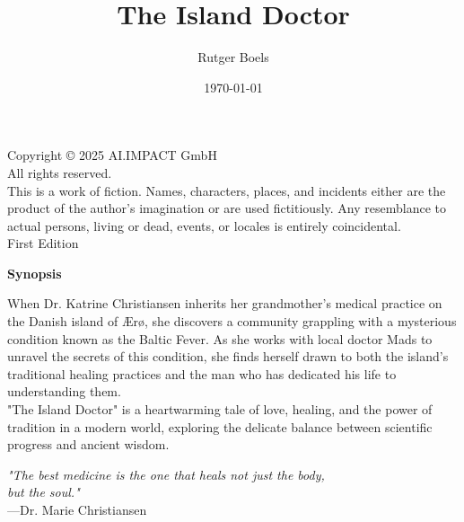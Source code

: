 \documentclass[12pt]{book}
\title{The Island Doctor}
\author{Rutger Boels}
\date{\today}
\begin{document}
\maketitle
\thispagestyle{empty}
\newpage

\thispagestyle{empty}
\vspace*{\fill}
\begin{center}
\small
Copyright © 2025 AI.IMPACT GmbH\\[1em]
All rights reserved.\\[1em]
This is a work of fiction. Names, characters, places, and incidents either are the product of the author's imagination or are used fictitiously. Any resemblance to actual persons, living or dead, events, or locales is entirely coincidental.\\[1em]
First Edition
\end{center}
\vspace*{\fill}
\newpage

\thispagestyle{empty}
\vspace*{\fill}
\begin{center}
\large\textbf{Synopsis}\\[1em]
\end{center}
\small
When Dr. Katrine Christiansen inherits her grandmother's medical practice on the Danish island of Ærø, she discovers a community grappling with a mysterious condition known as the Baltic Fever. As she works with local doctor Mads to unravel the secrets of this condition, she finds herself drawn to both the island's traditional healing practices and the man who has dedicated his life to understanding them.\\[0.5em]

"The Island Doctor" is a heartwarming tale of love, healing, and the power of tradition in a modern world, exploring the delicate balance between scientific progress and ancient wisdom.
\vspace*{\fill}
\newpage

\thispagestyle{empty}
\vspace*{\fill}
\begin{center}
\large\textit{"The best medicine is the one that heals not just the body,\\
but the soul."}\\[1em]
\small —Dr. Marie Christiansen
\end{center}
\vspace*{\fill}
\newpage
\end{document}
